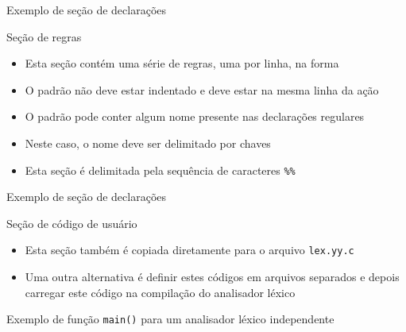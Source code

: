 \begin{frame}[fragile]{Exemplo de seção de declarações}
\end{frame}

\begin{frame}[fragile]{Seção de regras}

    \begin{itemize}
        \item Esta seção contém uma série de regras, uma por linha, na forma

        \item O padrão não deve estar indentado e deve estar na mesma linha da ação

        \item O padrão pode conter algum nome presente nas declarações regulares

        \item Neste caso, o nome deve ser delimitado por chaves

        \item Esta seção é delimitada pela sequência de caracteres \verb|%%|
    \end{itemize}

\end{frame}

\begin{frame}[fragile]{Exemplo de seção de declarações}
\end{frame}

\begin{frame}[fragile]{Seção de código de usuário}

    \begin{itemize}
        \item Esta seção também é copiada diretamente para o arquivo \texttt{lex.yy.c}

        \item Uma outra alternativa é definir estes códigos em arquivos separados e depois carregar este código na compilação do analisador léxico

    \end{itemize}

\end{frame}

\begin{frame}[fragile]{Exemplo de função {\tt main()} para um analisador léxico independente}


\end{frame}
